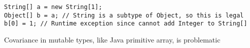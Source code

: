 \begin{algorithm}

\begin{verbatim}
String[] a = new String[1];	
Object[] b = a; // String is a subtype of Object, so this is legal
b[0] = 1; // Runtime exception since cannot add Integer to String[]
\end{verbatim}

\caption{Covariance in mutable types, like Java primitive array, is problematic \label{mutable-covariance}}
\end{algorithm}